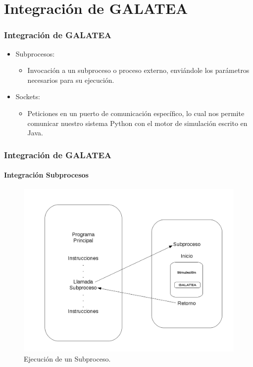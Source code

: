 \documentclass[spanish,xcolor=dvipsnames]{beamer}
\begin{document}
    
    \section{Integración de GALATEA}
    \begin{frame}
    	\frametitle{Integración de GALATEA}
    	
    	\begin{itemize}
    		\item Subprocesos:
    		\begin{itemize}
    			\item Invocación a un subproceso o proceso externo, enviándole los parámetros necesarios para su ejecución.
    		\end{itemize}
    		\item Sockets:
    		\begin{itemize}
    			\item Peticiones en un puerto de comunicación específico, lo cual nos permite comunicar nuestro sistema Python con el motor de simulación escrito en Java.
    		\end{itemize}
    	\end{itemize}
    \end{frame}
    \begin{frame}
    	\frametitle{Integración de GALATEA}
    	\framesubtitle{Integración Subprocesos}
    	
    	\begin{figure}[H]
    		\centering
    		\includegraphics[scale=0.3]{img/estructuraSubproceso.png}
    		\caption{Ejecución de un Subproceso.}
    		\label{subprocesoWork}
    	\end{figure}
    \end{frame}
\end{document}
